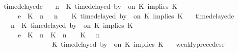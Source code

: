 \begin{isabellebody}
{\isacharbar}\ timedelayed{\isacharunderscore}e{}{\isacharcolon}\isanewline
\ \ {\isacartoucheopen}{\isacharparenleft}{\isasymGamma}{\isacharcomma}\ n\ {\isasymturnstile}\ {\isacharparenleft}{\isacharparenleft}K\ time{\isacharminus}delayed\ by\ {\isasymdelta}{\isasymtau}\ on\ K\ implies\ K\ {\isacharhash}\ {\isasymPsi}{\isacharparenright}\ {\isasymtriangleright}\ {\isasymPhi}{\isacharparenright}\isanewline
\ \ \ \ \ {\isasymhookrightarrow}\isactrlsub e\ \ {\isacharparenleft}{\isacharparenleft}{\isacharparenleft}K\ {\isasymnot}{\isasymUp}\ n{\isacharparenright}\ {\isacharhash}\ {\isasymGamma}{\isacharparenright}{\isacharcomma}\ n\ {\isasymturnstile}\ {\isasymPsi}\ {\isasymtriangleright}\ {\isacharparenleft}{\isacharparenleft}K\ time{\isacharminus}delayed\ by\ {\isasymdelta}{\isasymtau}\ on\ K\ implies\ K\ {\isacharhash}\ {\isasymPhi}{\isacharparenright}{\isacharparenright}{\isacartoucheclose}\isanewline
{\isacharbar}\ timedelayed{\isacharunderscore}e{}{\isacharcolon}\isanewline
\ \ {\isacartoucheopen}{\isacharparenleft}{\isasymGamma}{\isacharcomma}\ n\ {\isasymturnstile}\ {\isacharparenleft}{\isacharparenleft}K\ time{\isacharminus}delayed\ by\ {\isasymdelta}{\isasymtau}\ on\ K\ implies\ K\ {\isacharhash}\ {\isasymPsi}{\isacharparenright}\ {\isasymtriangleright}\ {\isasymPhi}{\isacharparenright}\isanewline
\ \ \ \ \ {\isasymhookrightarrow}\isactrlsub e\ \ {\isacharparenleft}{\isacharparenleft}{\isacharparenleft}K\ {\isasymUp}\ n{\isacharparenright}\ {\isacharhash}\ {\isacharparenleft}K\ {\isacharat}\ n\ {\isasymoplus}\ {\isasymdelta}{\isasymtau}\ {\isasymRightarrow}\ K\ {\isacharhash}\ {\isasymGamma}{\isacharparenright}{\isacharcomma}\ n\isanewline
\ \ \ \ \ \ \ \ \ \ \ \ {\isasymturnstile}\ {\isasymPsi}\ {\isasymtriangleright}\ {\isacharparenleft}{\isacharparenleft}K\ time{\isacharminus}delayed\ by\ {\isasymdelta}{\isasymtau}\ on\ K\ implies\ K\ {\isacharhash}\ {\isasymPhi}{\isacharparenright}{\isacharparenright}{\isacartoucheclose}\isanewline
{\isacharbar}\ weakly{\isacharunderscore}precedes{\isacharunderscore}e{\isacharcolon}\isanewline

\end{isabellebody}
